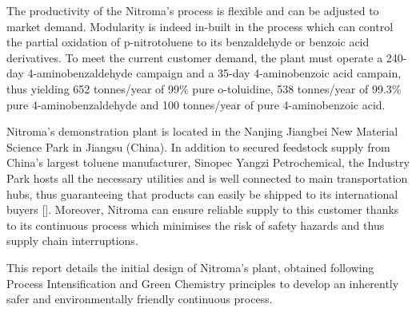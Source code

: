 The productivity of the Nitroma's process is flexible and can be adjusted to market demand. Modularity is indeed in-built in the process which can control the partial oxidation of p-nitrotoluene to its benzaldehyde or benzoic acid derivatives. To meet the current customer demand, the plant must operate a 240-day 4-aminobenzaldehyde campaign and a 35-day 4-aminobenzoic acid campain, thus yielding 652 tonnes/year of 99\% pure o-toluidine, 538 tonnes/year of 99.3\% pure 4-aminobenzaldehyde and 100 tonnes/year of pure 4-aminobenzoic acid.

Nitroma's demonstration plant is located in the Nanjing Jiangbei New Material Science Park in Jiangsu (China). In addition to secured feedstock supply from China’s largest toluene manufacturer, Sinopec Yangzi Petrochemical, the Industry Park hosts all the necessary utilities and is well connected to main transportation hubs, thus guaranteeing that products can easily be shipped to its international buyers []. Moreover, Nitroma can ensure reliable supply to this customer thanks to its continuous process which minimises the risk of safety hazards and thus supply chain interruptions.






This report details the initial design of Nitroma's plant, obtained following Process Intensification and Green Chemistry principles to develop an inherently safer and environmentally friendly continuous process.



